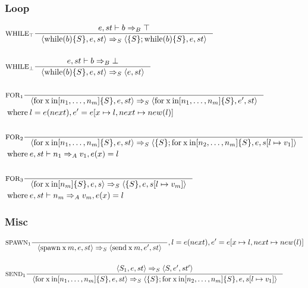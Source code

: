 \subsubsection{Loop}
\newcommand{\Tfor}{\mathbin{\text{for}}}
\newcommand{\Tx}{\mathbin{\text{x}}}
\newcommand{\Tin}{\mathbin{\text{in}}}
\newcommand{\Twhile}{\mathbin{\text{while}}}

\begin{align*}
&\inference[$\text{WHILE}_\top$]{e,st \vdash b \Rightarrow_B \top}
                       {\Braket{\Twhile(b)\{S\},e,st} \Rightarrow_S \Braket{\{S\}; \Twhile (b)\{S\},e,st}}
\\\\
&\inference[$\text{WHILE}_\bot$]{e,st \vdash b \Rightarrow_B \bot}
                       {\Braket{\Twhile(b)\{S\},e,st} \Rightarrow_S \Braket{e,st}}
\\\\
&\inference[$\text{FOR}_1$]{}
                       {\Braket{\Tfor \Tx \Tin [n_1,\dots,n_m]\{S\},e,st} \Rightarrow_S \Braket{\Tfor \mathbin{\text{x}} \mathbin{\text{in}} [n_1,\dots,n_m]\{S\},e',st}}
\\
&\mathbin{\text{where}} l = e(next), e' = e[x\mapsto l,next\mapsto new(l)]
\\\\
&\inference[$\text{FOR}_2$]{}
                       {\Braket{\Tfor \Tx \Tin [n_1,\dots,n_m]\{S\},e,st} \Rightarrow_S \Braket{\{S\}; \Tfor \mathbin{\text{x}} \mathbin{\text{in}} [n_2,\dots,n_m]\{S\},e,s[l\mapsto v_1]}}
\\
&\mathbin{\text{where}} e,st \vdash n_1 \Rightarrow_A v_1,e(x)=l
\\\\
&\inference[$\text{FOR}_3$]{}
                       {\Braket{\Tfor \mathbin{\text{x}} \mathbin{\text{in}} [n_m]\{S\},e,s} \Rightarrow_S \Braket{\{S\},e,s[l\mapsto v_m]}}
\\
&\mathbin{\text{where}} e,st \vdash n_m \Rightarrow_A v_m,e(x)=l
\end{align*}

\subsubsection{Misc}
\newcommand{\Tspawn}{\mathbin{\text{spawn}}}
\newcommand{\Tsend}{\mathbin{\text{send}}}
\begin{align*}
&\inference[$\text{SPAWN}_1$]{}
                       {\Braket{\Tspawn \Tx m,e,st} \Rightarrow_S \Braket{\Tsend \Tx m,e',st}}
												{, l = e(next), e' = e[x\mapsto l, next\mapsto new(l)]}
\\\\
&\inference[$\text{SEND}_1$]{\Braket{S_1,e,st} \Rightarrow_S \Braket{S,e',st'}}
                       {\Braket{\Tfor \Tx \Tin [n_1,\dots,n_m]\{S\},e,st} \Rightarrow_S \Braket{\{S\}; \Tfor \mathbin{\text{x}} \mathbin{\text{in}} [n_2,\dots,n_m]\{S\},e,s[l\mapsto v_1]}}
\\\\
\end{align*}